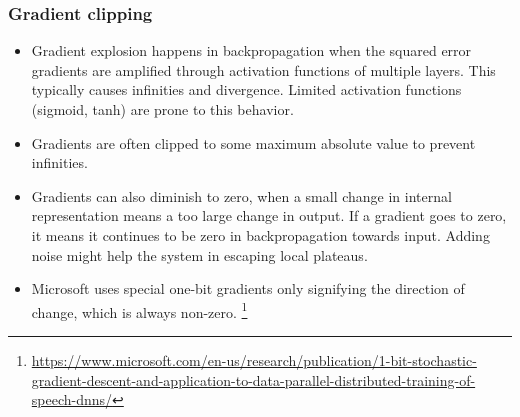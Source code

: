 \documentclass[8pt]{beamer}
\begin{document}
\begin{frame}
\frametitle{Gradient clipping}
 \begin{itemize}
  \item Gradient explosion happens in backpropagation when the squared error gradients are amplified through activation functions
        of multiple layers. This typically causes infinities and divergence. Limited activation functions (sigmoid, tanh) are prone to this behavior.
  \item Gradients are often clipped to some maximum absolute value to prevent infinities.
  \item Gradients can also diminish to zero, when a small change in internal representation means a too large change in output. If
        a gradient goes to zero, it means it continues to be zero in backpropagation towards input. Adding noise might help the system in escaping local plateaus.
  \item Microsoft uses special one-bit gradients only signifying the direction of change, which is always non-zero.
        \footnote{\href{https://www.microsoft.com/en-us/research/publication/1-bit-stochastic-gradient-descent-and-application-to-data-parallel-distributed-training-of-speech-dnns/}
        {https://www.microsoft.com/en-us/research/publication/1-bit-stochastic-gradient-descent-and-application-to-data-parallel-distributed-training-of-speech-dnns/}}

 \end{itemize}
\end{frame}
\end{document}
